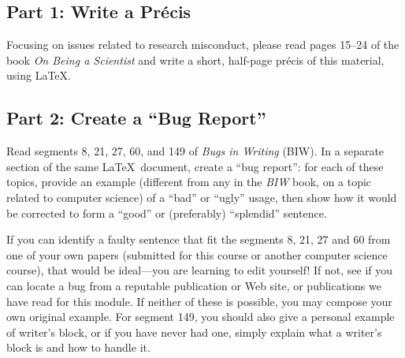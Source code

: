 

\usepackage[compact]{titlesec}




\subsection*{Part 1: Write a Pr\'{e}cis}

Focusing on issues related to research misconduct, please read pages 15--24 of the book {\em On Being a Scientist} and write a short,
half-page pr\'{e}cis of this material, using \LaTeX.

\subsection*{Part 2: Create a ``Bug Report''}

Read segments 8, 21, 27, 60, and 149 of {\em Bugs in Writing} (BIW).  In a separate section of the same \LaTeX\
document, create a ``bug report'': for each of these topics, provide an example (different from any in the {\em BIW}
book, on a topic related to computer science) of a ``bad'' or ``ugly'' usage, then show how it would be corrected to
form a ``good'' or (preferably) ``splendid'' sentence.


If you can identify a faulty sentence that fit the segments 8, 21, 27 and 60 from one of your own papers (submitted for
this course or another computer science course), that would be ideal---you are learning to edit yourself!  If not, see
if you can locate a bug from a reputable publication or Web site, or publications we have read for this
module. If neither of these is possible, you may compose your own original example. For segment 149, you should also
give a personal example of writer's block, or if you have never had one, simply explain what a writer's block is and how
to handle it.

